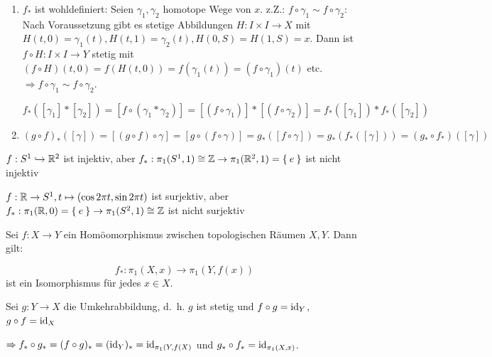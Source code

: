 \begin{beweis}\leavevmode
    \begin{enumerate}[label=\alph*)]
        \item $f_*$ ist wohldefiniert: Seien $\gamma_1, \gamma_2$ homotope
              Wege von $x$. z.Z.: $f \circ \gamma_1 \sim f \circ \gamma_2$:
              Nach Voraussetzung gibt es stetige Abbildungen $H:I\times I \rightarrow X$
              mit $H(t,0) = \gamma_1(t), H(t,1) = \gamma_2(t), H(0,S) = H(1, S) = x$.
              Dann ist $f \circ H: I \times I \rightarrow Y$ stetig mit
              $(f \circ H)(t,0) = f(H(t,0)) = f(\gamma_1(t)) = (f \circ \gamma_1)(t)$
              etc. $\Rightarrow f \circ \gamma_1 \sim f \circ \gamma_2$.

              $f_*([\gamma_1] * [\gamma_2]) = [f \circ (\gamma_1 * \gamma_2)] = [(f \circ \gamma_1)] * [(f \circ \gamma_2)] = f_*([\gamma_1]) * f_*([\gamma_2])$
        \item $(g \circ f)_* ([\gamma]) = [(g \circ f) \circ \gamma] = [g \circ (f \circ \gamma)] = g_* ([f \circ \gamma]) = g_* (f_* ([\gamma])) = (g_* \circ f_*)([\gamma])$
    \end{enumerate}
\end{beweis}

\begin{beispiel}
    \begin{bspenum}
        \item $f:S^1 \hookrightarrow \mathbb{R}^2$ ist injektiv, aber 
              $f_*:\pi_1(S^1, 1) \cong \mathbb{Z} \rightarrow \pi_1(\mathbb{R}^2, 1) = \Set{e}$
              ist nicht injektiv
        \item $f: \mathbb{R} \rightarrow S^1, t \mapsto (\cos 2 \pi t, \sin 2 \pi t)$
              ist surjektiv, aber $f_*: \pi_1(\mathbb{R}, 0) = \Set{e} \rightarrow \pi_1(S^2, 1) \cong \mathbb{Z}$
              ist nicht surjektiv
    \end{bspenum}
\end{beispiel}

\begin{bemerkung}%
    Sei $f:X \rightarrow Y$ ein Homöomorphismus zwischen topologischen
    Räumen $X, Y$. Dann gilt:

    \[f_*: \pi_1(X,x) \rightarrow \pi_1(Y, f(x))\]
    ist ein Isomorphismus für jedes $x \in X$.
\end{bemerkung}

\begin{beweis}
    Sei $g: Y \rightarrow X$ die Umkehrabbildung, d.~h. $g$ ist stetig
    und $f \circ g = \textnormal{id}_Y$, $g \circ f = \textnormal{id}_X$

    $\Rightarrow f_* \circ g_* = (f \circ g)_* = (\textnormal{id}_Y)_* = \textnormal{id}_{\pi_1 (Y, f(X)}$
    und $g_* \circ f_* = \textnormal{id}_{\pi_1(X,x)}$.
\end{beweis}

